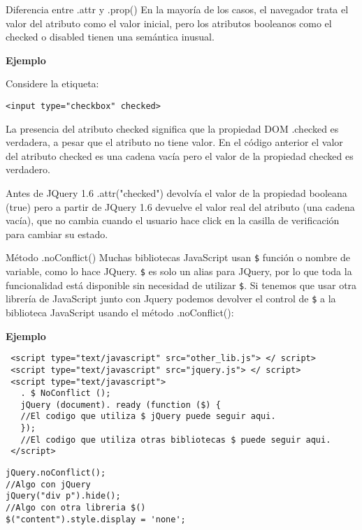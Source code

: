 \begin{frame}[fragile]{Diferencia entre .attr y .prop()} %
En la mayoría de los casos,  el navegador trata el valor del atributo como el valor inicial,  pero los atributos booleanos como el checked o disabled tienen una semántica inusual.

\textbf{Ejemplo}

Considere la etiqueta:
\begin{lstlisting}
<input type="checkbox" checked>
\end{lstlisting}
La presencia del atributo checked significa que la propiedad DOM .checked es verdadera, a pesar que el atributo no tiene valor. En el código anterior el valor del atributo checked es una cadena vacía pero el valor de la propiedad checked es verdadero.

Antes de JQuery 1.6 .attr("checked") devolvía el valor de la propiedad booleana
(true) pero a partir de JQuery 1.6 devuelve el valor real del atributo (una
cadena vacía), que no cambia cuando el usuario hace click en la casilla de verificación para cambiar su estado.
\end{frame}

\begin{frame}[fragile]{Método .noConflict()} %
Muchas bibliotecas JavaScript usan \texttt{\$} función o nombre de variable,
como lo hace JQuery. \texttt{\$} es solo un alias para JQuery, por lo que toda
la funcionalidad está disponible sin necesidad de utilizar \texttt{\$}. Si
tenemos que usar otra librería de JavaScript junto con Jquery podemos devolver el control de \texttt{\$} a la biblioteca JavaScript usando el método
.noConflict():

\textbf{Ejemplo}

\begin{lstlisting}
 <script type="text/javascript" src="other_lib.js"> </ script>
 <script type="text/javascript" src="jquery.js"> </ script>
 <script type="text/javascript">
   . $ NoConflict ();
   jQuery (document). ready (function ($) {
   //El codigo que utiliza $ jQuery puede seguir aqui.
   });
   //El codigo que utiliza otras bibliotecas $ puede seguir aqui.
 </script>
\end{lstlisting}

\begin{lstlisting}
jQuery.noConflict();
//Algo con jQuery
jQuery("div p").hide();
//Algo con otra libreria $()
$("content").style.display = 'none';
\end{lstlisting}
\end{frame}

